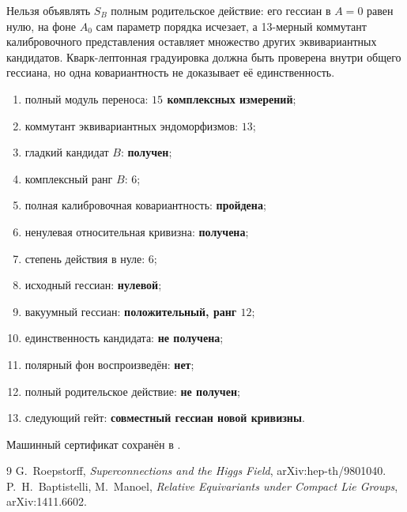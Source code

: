 \begin{nogocriterion}
Нельзя объявлять $S_B$ полным родительское действие: его гессиан в $A=0$ равен
нулю, на фоне $A_0$ сам параметр порядка исчезает, а 13-мерный коммутант
калибровочного представления оставляет множество других эквивариантных кандидатов.
Кварк-лептонная градуировка должна быть проверена внутри общего гессиана,
но одна ковариантность не доказывает её единственность.
\end{nogocriterion}

\begin{protocol}
\begin{enumerate}
 \item полный модуль переноса: \textbf{$15$ комплексных измерений};
 \item коммутант эквивариантных эндоморфизмов: \textbf{$13$};
 \item гладкий кандидат $B$: \textbf{получен};
 \item комплексный ранг $B$: \textbf{$6$};
 \item полная калибровочная ковариантность: \textbf{пройдена};
 \item ненулевая относительная кривизна: \textbf{получена};
 \item степень действия в нуле: \textbf{$6$};
 \item исходный гессиан: \textbf{нулевой};
 \item вакуумный гессиан: \textbf{положительный, ранг $12$};
 \item единственность кандидата: \textbf{не получена};
 \item полярный фон воспроизведён: \textbf{нет};
 \item полный родительское действие: \textbf{не получен};
 \item следующий гейт: \textbf{совместный гессиан новой кривизны}.
\end{enumerate}
\end{protocol}

Машинный сертификат сохранён в
.

\begin{thebibliography}{9}
G.~Roepstorff,
\emph{Superconnections and the Higgs Field},
arXiv:hep-th/9801040.
P.~H.~Baptistelli, M.~Manoel,
\emph{Relative Equivariants under Compact Lie Groups},
arXiv:1411.6602.
\end{thebibliography}